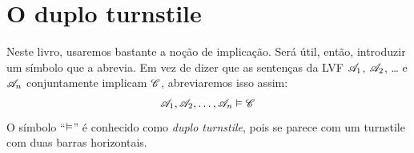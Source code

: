 



\section{O duplo turnstile}
Neste livro, usaremos bastante a noção de implicação. Será útil, então, introduzir um símbolo que a abrevia. Em vez de dizer que as sentenças da LVF $\mathscr{A}_1$, $\mathscr{A}_2$, \dots{} e $\mathscr{A}_n$ conjuntamente implicam $\mathscr{C}$, abreviaremos isso assim:
	$$\mathscr{A}_1, \mathscr{A}_2, \dots, \mathscr{A}_n \vDash \mathscr{C}$$
O símbolo \textquotedblleft{}$\vDash$\textquotedblright{} é conhecido como \emph{duplo turnstile}, pois se parece com um turnstile com duas barras horizontais.

